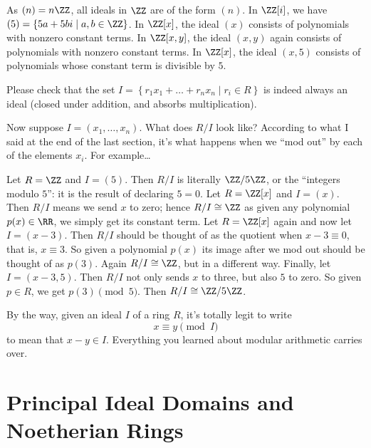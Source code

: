 \begin{example}
	\listhack
	\begin{enumerate}[(a)]
		\ii As $(n) = n\ZZ$, all ideals in $\ZZ$ are of the form $(n)$.
		\ii In $\ZZ[i]$, we have
		$(5) = \left\{ 5a + 5b i \mid a,b \in \ZZ \right\}$.
		\ii In $\ZZ[x]$, the ideal $(x)$ consists of polynomials
		with nonzero constant terms.
		\ii In $\ZZ[x,y]$, the ideal $(x,y)$ again consists
		of polynomials with nonzero constant terms.
		\ii In $\ZZ[x]$, the ideal $(x,5)$ consists of polynomials
		whose constant term is divisible by $5$.
	\end{enumerate}
\end{example}
\begin{ques}
	Please check that the set 
	$I = \left\{ r_1x_1 + \dots + r_nx_n \mid r_i \in R \right\}$
	is indeed always an ideal (closed under addition,
	and absorbs multiplication).
\end{ques}

Now suppose $I = (x_1, \dots, x_n)$.
What does $R/I$ look like?
According to what I said at the end of the last section,
it's what happens when we ``mod out'' by each of the elements $x_i$.
For example\dots
\begin{example}
	\listhack
	\begin{enumerate}[(a)]
		\ii Let $R = \ZZ$ and $I = (5)$. Then $R/I$ is literally
		$\ZZ/5\ZZ$, or the ``integers modulo $5$'':
		it is the result of declaring $5 = 0$.
		\ii Let $R = \ZZ[x]$ and $I = (x)$.
		Then $R/I$ means we send $x$ to zero; hence $R/I \cong \ZZ$
		as given any polynomial $p(x) \in \RR$,
		we simply get its constant term.
		\ii Let $R = \ZZ[x]$ again and now let $I = (x-3)$.
		Then $R/I$ should be thought of as the quotient when $x-3 \equiv 0$,
		that is, $x \equiv 3$.
		So given a polynomial $p(x)$ its image after
		we mod out should be thought of as $p(3)$.
		Again $R/I \cong \ZZ$, but in a different way.
		\ii Finally, let $I = (x-3,5)$.
		Then $R/I$ not only sends $x$ to three, but also $5$ to zero.
		So given $p \in R$, we get $p(3) \pmod 5$.
		Then $R/I \cong \ZZ/5\ZZ$.
	\end{enumerate}
\end{example}
By the way, given an ideal $I$ of a ring $R$, it's totally legit to write
\[ x \equiv y \pmod I \]
to mean that $x-y \in I$.
Everything you learned about modular arithmetic carries over.

\section{Principal Ideal Domains and Noetherian Rings}

